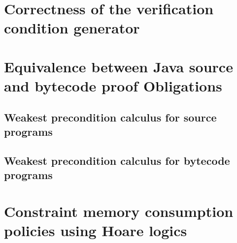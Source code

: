 \documentclass[book,10pt]{book}
\begin{document}
\chapter{Correctness of the verification condition generator}\label{proofGeneral}
  
  
  
  



\chapter{Equivalence between Java source and bytecode proof Obligations}\label{pogEquiv}
  
  
  
   
	 
  
   
   
   
  

  \section{Weakest precondition calculus for source programs}\label{pog:wpSrcGeneral}
     
    	  
    
    
    


  \section{Weakest precondition calculus for bytecode programs}\label{pog:wpBcGeneral}
    
    
     




 
\chapter{Constraint memory consumption policies using Hoare logics}
  
  \lstset{numbers=none}
\end{document}
